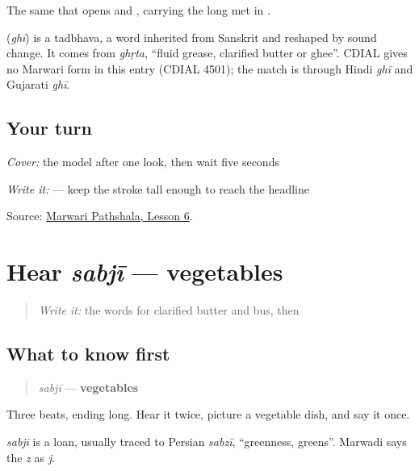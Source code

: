 The same \textbf{} that opens \textbf{} and \textbf{}, carrying the long \textbf{} met in \textbf{}.

\begin{cousinweb}
\textbf{} (\emph{ghī}) is a tadbhava, a word inherited from Sanskrit and reshaped by sound change. It comes from \emph{ghṛta}, \textquotedblleft{}fluid grease, clarified butter or ghee\textquotedblright{}. CDIAL gives no Marwari form in this entry (CDIAL 4501); the match is through Hindi \emph{ghī} and Gujarati \emph{ghī}.
\end{cousinweb}

\subsection*{Your turn}
\emph{Cover:} the model after one look, then wait five seconds

\emph{Write it:} \textbf{} — keep the \textbf{} stroke tall enough to reach the headline

\begin{tcolorbox}[breakable,colback=teal!4,colframe=teal!35!black,title={Before you move on}]
Source: \href{https://www.marwaripathshala.com/marwari-lesson-6-english}{Marwari Pathshala, Lesson 6}.
\end{tcolorbox}
\section[sabjī]{Hear \emph{sabjī} — vegetables}

\label{lesson:MW-C18-hear-sabji}



\begin{quote}
\emph{Write it:} the words for clarified butter and bus, then \textbf{}
\end{quote}

\subsection*{What to know first}
\begin{quote}
\emph{sabjī} — \textbf{vegetables}
\end{quote}

Three beats, ending long. Hear it twice, picture a vegetable dish, and say it once.

\begin{cousinweb}
\emph{sabjī} is a loan, usually traced to Persian \emph{sabzī}, \textquotedblleft{}greenness, greens\textquotedblright{}. Marwadi says the \emph{z} as \emph{j}.
\end{cousinweb}

